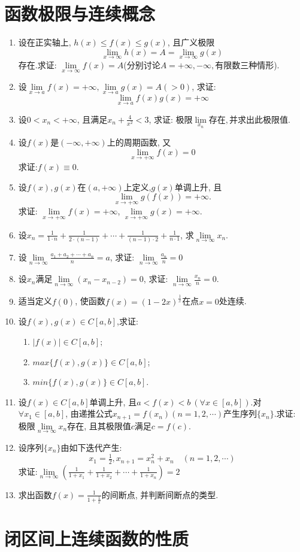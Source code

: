 \section{函数极限与连续概念}
\begin{enumerate}
	\item 设在正实轴上, $h(x)\le f(x)\le g(x)$, 且广义极限$$
	\lim\limits_{x\rightarrow \infty}h(x) = A = \lim\limits_{x\rightarrow \infty}g(x)$$存在.求证: $\lim\limits_{x\rightarrow \infty}f(x)=A$(分别讨论$A=+\infty,-\infty,有限数三种情形$).
	\item 设$\lim\limits_{x\rightarrow a}f(x)=+\infty,\lim\limits_{x\rightarrow a}g(x)=A(>0)$, 求证:$$
	\lim\limits_{x\rightarrow a}f(x)g(x) = +\infty$$
	\item 设$0<x_n<+\infty$, 且满足$x_n+\frac{4}{x^2}<3$, 求证: 极限$\lim\limits_{x_n}存在, 并求出此极限值$.
	\item 设$f(x)$是$(-\infty,+\infty)$上的周期函数, 又$$
	\lim\limits_{x\rightarrow +\infty}f(x)=0$$ 求证:$f(x)\equiv 0$.
	\item 设$f(x),g(x)$在$(a,+\infty)$上定义,$g(x)$单调上升, 且$$
	\lim\limits_{x\rightarrow +\infty}g(f(x))=+\infty.$$
	求证: $\lim\limits_{x\rightarrow +\infty}f(x)=+\infty$, $\lim\limits_{x\rightarrow +\infty}g(x)=+\infty$.
	\item 设$x_n=\tfrac{1}{1 \cdot n}+\tfrac{1}{2 \cdot (n-1)}+\cdots+\tfrac{1}{(n-1) \cdot 2}+\tfrac{1}{n \cdot 1}$, 求$\lim\limits_{n\rightarrow \infty}x_n$.
	\item 设$\lim\limits_{n\rightarrow \infty}\tfrac{a_1+a_2+\cdots+a_n}{n}=a$, 求证: $\lim\limits_{n\rightarrow \infty}\tfrac{a_n}{n}=0$
	\item 设${x_n}$满足$\lim\limits_{n\rightarrow \infty}(x_n-x_{n-2})=0$, 求证: $\lim\limits_{n\rightarrow \infty}\tfrac{x_n}{n}=0$.
	\item 适当定义$f(0)$, 使函数$f(x)=(1-2x)^\frac{1}{x}$在点$x=0$处连续.
	\item 设$ f(x),g(x)\in C[a,b]$,求证:
	\begin{enumerate}
		\item $|f(x)|\in C[a,b];$\
		\item $max\{f(x),g(x)\}\in C[a,b]$;
		\item $min\{f(x),g(x)\}\in C[a,b]$.
	\end{enumerate}
	\item 设$f(x)\in C[a,b]$单调上升, 且$a<f(x)<b\ (\forall x\in [a,b])$.对$\forall x_1 \in [a,b]$, 由递推公式$x_{n+1}=f(x_n)(n=1,2,\cdots)$产生序列$\{x_n\}$.求证: 极限$\lim\limits_{n\rightarrow \infty}x_n$存在, 且其极限值$c$满足$c=f(c)$.
	\item 设序列$\{x_n\}$由如下迭代产生:
	$$
	x_1 = \tfrac{1}{2}, x_{n+1} = x_{n}^2 + x_n \quad (n = 1,2,\cdots)
	$$求证:$\lim\limits_{n\rightarrow \infty}(\frac{1}{1+x_1}+\frac{1}{1+x_2}+\cdots+\frac{1}{1+x_n})=2$
	\item 求出函数$f(x)=\frac{1}{1+\frac{1}{x}}$的间断点, 并判断间断点的类型.
\end{enumerate}
\section{闭区间上连续函数的性质}